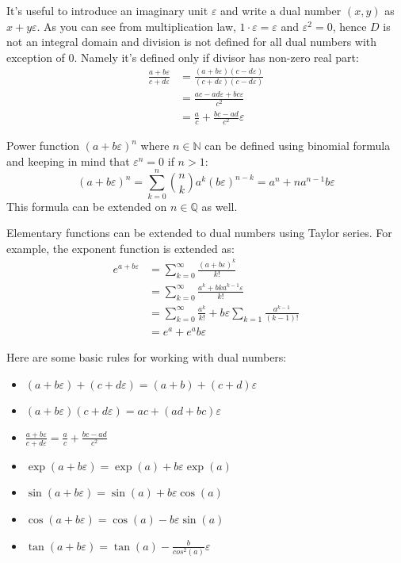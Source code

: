 \documentclass[reprint,amsmath,amssymb,aps,pre,showkeys,showpacs]{revtex4-1}
\begin{document}
It's useful to introduce an imaginary unit $\varepsilon$ and write a dual number
$(x, y)$ as $x + y\varepsilon$. As you can see from multiplication law,
$1\cdot \varepsilon = \varepsilon$ and $\varepsilon^2 = 0$, hence $D$ is not an
integral domain and division is not defined for all dual numbers with exception
of $0$. Namely it's defined only if divisor has non-zero real part:
\begin{align*}
  \frac{a+b\varepsilon}{c+d\varepsilon} &=
  \frac{(a+b\varepsilon)(c-d\varepsilon)}{(c+d\varepsilon)(c-d\varepsilon)} \\
  &= \frac{ac-ad\varepsilon+bc\varepsilon}{c^2} \\
  &= \frac{a}{c} + \frac{bc-ad}{c^2}\varepsilon
\end{align*}

Power function $(a + b\varepsilon)^n$ where $n \in \mathbb{N}$ can be defined
using binomial formula and keeping in mind that $\varepsilon^n = 0$ if $n>1$:
\begin{equation*}
  (a + b\varepsilon)^n = \sum_{k=0}^n \binom{n}{k} a^k (b\varepsilon)^{n-k} =
  a^n + n a^{n-1} b \varepsilon
\end{equation*}
This formula can be extended on $n \in \mathbb{Q}$ as well.

Elementary functions can be extended to dual numbers using Taylor series. For
example, the exponent function is extended as:
\begin{align*}
  e^{a + b\varepsilon} &= \sum_{k=0}^{\infty}\frac{(a + b\varepsilon)^k}{k!} \\
  &= \sum_{k=0}^{\infty} \frac{a^k + bka^{k-1}\varepsilon}{k!} \\
  &= \sum_{k=0}^{\infty} \frac{a^k}{k!} + b\varepsilon \sum_{k=1}
  \frac{a^{k-1}}{(k-1)!} \\
  &= e^a + e^ab\varepsilon
\end{align*}

Here are some basic rules for working with dual numbers:
\begin{itemize}
\item $(a + b\varepsilon) + (c + d\varepsilon) = (a + b) + (c + d)\varepsilon$
\item $(a + b\varepsilon) (c + d\varepsilon) = ac + (ad + bc)\varepsilon$
\item $\frac{a + b\varepsilon}{c + d\varepsilon} = \frac{a}{c} + \frac{bc - ad}{c^2}$
\item $\exp(a + b\varepsilon) = \exp(a) + b\varepsilon\exp(a)$
\item $\sin(a + b\varepsilon) = \sin(a) + b\varepsilon\cos(a)$
\item $\cos(a + b\varepsilon) = \cos(a) - b\varepsilon\sin(a)$
\item $\tan(a + b\varepsilon) = \tan(a) - \frac{b}{cos^2(a)}\varepsilon$
\end{itemize}
\end{document}
